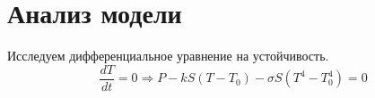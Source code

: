 \section{Анализ модели}
    Исследуем дифференциальное уравнение на устойчивость.
    \[
        \frac{dT}{dt} = 0 \Rightarrow  P - k S (T - T_0) - \sigma S (T^4 - T_0^4) = 0
    \]